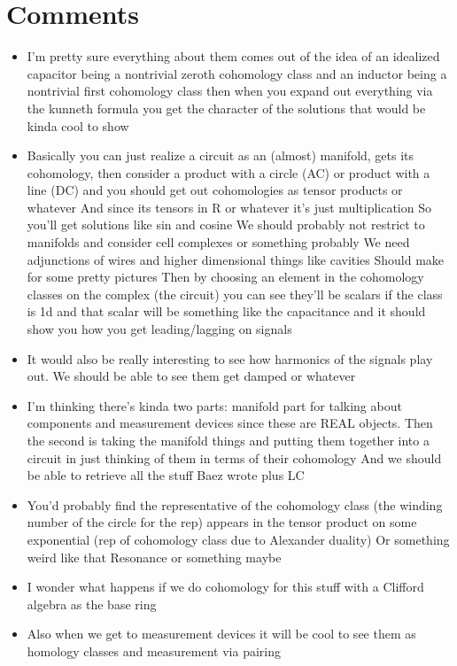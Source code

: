 \documentclass{article}
\begin{document}
\section*{Comments}
\begin{itemize}
    
    \item I'm pretty sure everything about them comes out of the idea of an idealized capacitor being a nontrivial zeroth cohomology class
    and an inductor being a nontrivial first cohomology class
    then when you expand out everything via the kunneth formula you get the character of the solutions
    that would be kinda cool to show
    \item Basically you can just realize a circuit as an (almost) manifold, gets its cohomology, then consider a product with a circle (AC) or product with a line (DC) and you should get out cohomologies as tensor products or whatever
    And since its tensors in R or whatever it’s just multiplication
    So you’ll get solutions like sin and cosine
    We should probably not restrict to manifolds and consider cell complexes or something probably
    We need adjunctions of wires and higher dimensional things like cavities
    Should make for some pretty pictures
    Then by choosing an element in the cohomology classes on the complex (the circuit) you can see they’ll be scalars if the class is 1d and that scalar will be something like the capacitance and it should show you how you get leading/lagging on signals
    \item It would also be really interesting to see how harmonics of the signals play out. We should be able to see them get damped or whatever
    \item I’m thinking there’s kinda two parts: manifold part for talking about components and measurement devices since these are REAL objects. Then the second is taking the manifold things and putting them together into a circuit in just thinking of them in terms of their cohomology
    And we should be able to retrieve all the stuff Baez wrote plus LC
    \item You’d probably find the representative of the cohomology class (the winding number of the circle for the rep) appears in the tensor product on some exponential (rep of cohomology class due to Alexander duality)
    Or something weird like that
    Resonance or something maybe
    \item I wonder what happens if we do cohomology for this stuff with a Clifford algebra as the base ring
    \item Also when we get to measurement devices it will be cool to see them as homology classes and measurement via pairing
\end{itemize}
\end{document}
